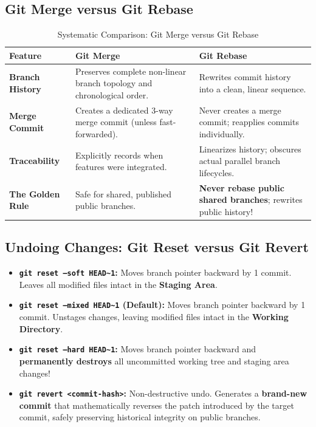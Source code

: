 \subsection{Git Merge versus Git Rebase}
\begin{table}[htbp]
\centering
\small
\begin{tabularx}{\textwidth}{l X X}
\toprule
\textbf{Feature} & \textbf{Git Merge} & \textbf{Git Rebase} \\
\midrule
\textbf{Branch History} & Preserves complete non-linear branch topology and chronological order. & Rewrites commit history into a clean, linear sequence. \\
\textbf{Merge Commit} & Creates a dedicated 3-way merge commit (unless fast-forwarded). & Never creates a merge commit; reapplies commits individually. \\
\textbf{Traceability} & Explicitly records when features were integrated. & Linearizes history; obscures actual parallel branch lifecycles. \\
\textbf{The Golden Rule} & Safe for shared, published public branches. & \textbf{Never rebase public shared branches}; rewrites public history! \\
\bottomrule
\end{tabularx}
\caption{Systematic Comparison: Git Merge versus Git Rebase}
\label{tab:git_merge_vs_rebase}
\end{table}

\subsection{Undoing Changes: Git Reset versus Git Revert}
\begin{itemize}[leftmargin=*]
    \item \textbf{\texttt{git reset --soft HEAD\~{}1}:} Moves branch pointer backward by 1 commit. Leaves all modified files intact in the \textbf{Staging Area}.
    \item \textbf{\texttt{git reset --mixed HEAD\~{}1} (Default):} Moves branch pointer backward by 1 commit. Unstages changes, leaving modified files intact in the \textbf{Working Directory}.
    \item \textbf{\texttt{git reset --hard HEAD\~{}1}:} Moves branch pointer backward and \textbf{permanently destroys} all uncommitted working tree and staging area changes!
    \item \textbf{\texttt{git revert <commit-hash>}:} Non-destructive undo. Generates a \textbf{brand-new commit} that mathematically reverses the patch introduced by the target commit, safely preserving historical integrity on public branches.
\end{itemize}

